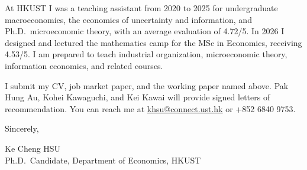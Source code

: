 \documentclass[11pt]{article}
\begin{document}
At HKUST I was a teaching assistant from 2020 to 2025 for undergraduate macroeconomics, the economics of uncertainty and information, and Ph.D.\ microeconomic theory, with an average evaluation of 4.72/5. In 2026 I designed and lectured the mathematics camp for the MSc in Economics, receiving 4.53/5. I am prepared to teach industrial organization, microeconomic theory, information economics, and related courses.

I submit my CV, job market paper, and the working paper named above. Pak Hung Au, Kohei Kawaguchi, and Kei Kawai will provide signed letters of recommendation. You can reach me at \href{mailto:khsu@connect.ust.hk}{khsu@connect.ust.hk} or +852 6840 9753.

\vspace{0.35em}
Sincerely,

\vspace{0.35em}
Ke Cheng HSU \\
Ph.D.\ Candidate, Department of Economics, HKUST
\end{document}
